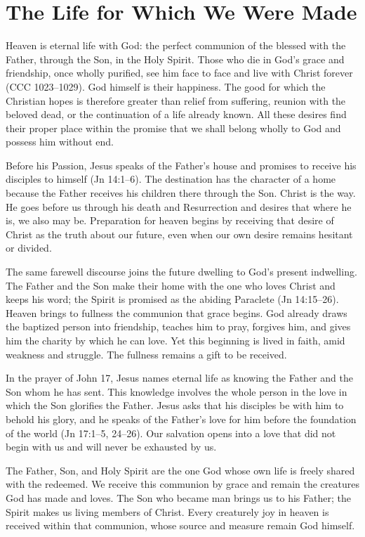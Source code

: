 \section{The Life for Which We Were Made}

Heaven is eternal life with God: the perfect communion of the blessed with the Father, through the Son, in the Holy Spirit. Those who die in God's grace and friendship, once wholly purified, see him face to face and live with Christ forever (CCC 1023--1029). God himself is their happiness. The good for which the Christian hopes is therefore greater than relief from suffering, reunion with the beloved dead, or the continuation of a life already known. All these desires find their proper place within the promise that we shall belong wholly to God and possess him without end.

Before his Passion, Jesus speaks of the Father's house and promises to receive his disciples to himself (Jn 14:1--6). The destination has the character of a home because the Father receives his children there through the Son. Christ is the way. He goes before us through his death and Resurrection and desires that where he is, we also may be. Preparation for heaven begins by receiving that desire of Christ as the truth about our future, even when our own desire remains hesitant or divided.

The same farewell discourse joins the future dwelling to God's present indwelling. The Father and the Son make their home with the one who loves Christ and keeps his word; the Spirit is promised as the abiding Paraclete (Jn 14:15--26). Heaven brings to fullness the communion that grace begins. God already draws the baptized person into friendship, teaches him to pray, forgives him, and gives him the charity by which he can love. Yet this beginning is lived in faith, amid weakness and struggle. The fullness remains a gift to be received.

In the prayer of John 17, Jesus names eternal life as knowing the Father and the Son whom he has sent. This knowledge involves the whole person in the love in which the Son glorifies the Father. Jesus asks that his disciples be with him to behold his glory, and he speaks of the Father's love for him before the foundation of the world (Jn 17:1--5, 24--26). Our salvation opens into a love that did not begin with us and will never be exhausted by us.

The Father, Son, and Holy Spirit are the one God whose own life is freely shared with the redeemed. We receive this communion by grace and remain the creatures God has made and loves. The Son who became man brings us to his Father; the Spirit makes us living members of Christ. Every creaturely joy in heaven is received within that communion, whose source and measure remain God himself.


